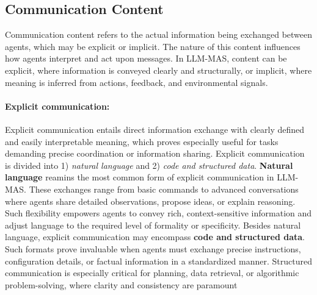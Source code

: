 \subsection{Communication Content}
Communication content refers to the actual information being exchanged between agents, which may be explicit or implicit. The nature of this content influences how agents interpret and act upon messages. In LLM-MAS, content can be explicit, where information is conveyed clearly and structurally, or implicit, where meaning is inferred from actions, feedback, and environmental signals.

\paragraph{Explicit communication:}Explicit communication entails direct information exchange with clearly defined and easily interpretable meaning, which proves especially useful for tasks demanding precise coordination or information sharing. Explicit communication is divided into 1) \textit{natural language} and 2) \textit {code and structured data}. \textbf{Natural language} reamins the most common form of explicit communication in LLM-MAS. These exchanges range from basic commands to advanced conversations where agents share detailed observations, propose ideas, or explain reasoning. Such flexibility empowers agents to convey rich, context-sensitive information and adjust language to the required level of formality or specificity. Besides natural language, explicit communication may encompass \textbf{code and structured data}. Such formats prove invaluable when agents must exchange precise instructions, configuration details, or factual information in a standardized manner. Structured communication is especially critical for planning, data retrieval, or algorithmic problem-solving, where clarity and consistency are paramount

